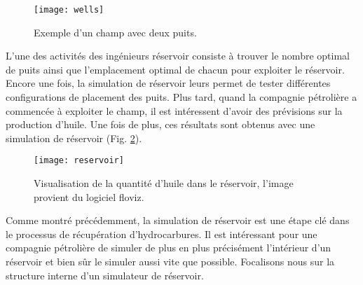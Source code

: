 \begin{figure}[!ht]
  \centering
  \texttt{[image: wells]}
  \caption{Exemple d'un champ avec deux puits.}
\label{fig:wells}
\end{figure}


L'une des activités des ingénieurs réservoir consiste à trouver le nombre optimal de puits ainsi que l'emplacement optimal de chacun pour exploiter le réservoir.
%
Encore une fois, la simulation de réservoir leurs permet de tester différentes configurations de placement des puits.
%
Plus tard, quand la compagnie pétrolière a commencée à exploiter le champ, il est intéressent d'avoir des prévisions sur la production d'huile.
%
Une fois de plus, ces résultats sont obtenus avec une simulation de réservoir (Fig. \ref{fig:floviz}).

\begin{figure}[!ht]
  \centering
  \texttt{[image: reservoir]}
  \caption{Visualisation de la quantité d'huile dans le réservoir, l'image provient du logiciel floviz.}
\label{fig:floviz}
\end{figure}

Comme montré précédemment, la simulation de réservoir est une étape clé dans le processus de récupération d'hydrocarbures.
%
Il est intéressant pour une compagnie pétrolière de simuler de plus en plus précisément l'intérieur d'un réservoir et bien sûr le simuler aussi vite que possible.
%
Focalisons nous sur la structure interne d'un simulateur de réservoir.
